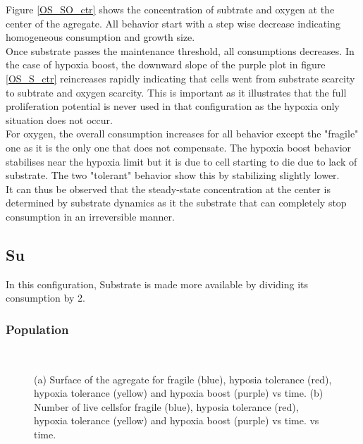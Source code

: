 \documentclass[11pt,a4paper]{article}
\begin{document}
Figure \ref{OS_SO_ctr} shows the concentration of subtrate and oxygen at the center of the agregate. All behavior start with a step wise decrease indicating homogeneous consumption and growth size.\\

Once substrate passes the maintenance threshold, all consumptions decreases. In the case of hypoxia boost, the downward slope of the purple plot in figure \ref{OS_S_ctr} reincreases rapidly indicating that cells went from substrate scarcity to subtrate and oxygen scarcity. This is important as it illustrates that the full proliferation potential is never used in that configuration as the hypoxia only situation does not occur.\\

For oxygen, the overall consumption increases for all behavior except the "fragile" one as it is the only one that does not compensate. The hypoxia boost behavior stabilises near the hypoxia limit but it is due to cell starting to die due to lack of substrate. The two "tolerant" behavior show this by stabilizing slightly lower.\\

It can thus be observed that the steady-state concentration at the center is determined by substrate dynamics as it the substrate that can completely stop consumption in an irreversible manner.\\


\subsection{Su}
In this configuration, Substrate is made more available by dividing its consumption by 2.

\subsubsection{Population}
\begin{figure}[h]
\begin{subfigure}{0.5\textwidth}
	\centering
	
	\caption{ \label{Su_OS_area}}
\end{subfigure}
~~
\begin{subfigure}{0.5\textwidth}
	\centering
	
	\caption{\label{Su_OS_live}}
\end{subfigure}
\caption{(a) Surface of the agregate for fragile (blue), hyposia tolerance (red), hypoxia tolerance (yellow) and hypoxia boost (purple) vs time. (b) Number of live cellsfor fragile (blue), hyposia tolerance (red), hypoxia tolerance (yellow) and hypoxia boost (purple) vs time. vs time. \label{Su_OS_area_live}}
\end{figure}
\end{document}
